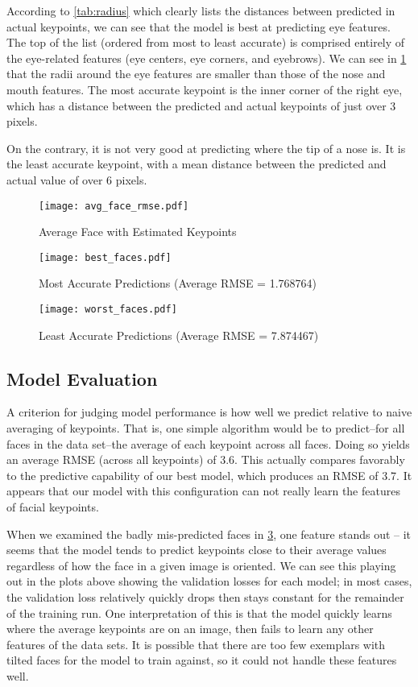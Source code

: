 \documentclass{article}
\begin{document}
According to \ref{tab:radius} which clearly lists the distances between predicted in actual keypoints, we can see that the model is best at predicting eye features. The top of the list (ordered from most to least accurate) is comprised entirely of the eye-related features (eye centers, eye corners, and eyebrows). We can see in \ref{fig:avg_face_rmse} that the radii around the eye features are smaller than those of the nose and mouth features. The most accurate keypoint is the inner corner of the right eye, which has a distance between the predicted and actual keypoints of just over 3 pixels.

On the contrary, it is not very good at predicting where the tip of a nose is. It is the least accurate keypoint, with a mean distance between the predicted and actual value of over 6 pixels.



\begin{figure}[!htb]
  \centering
  \caption{Average Face with Estimated Keypoints}
  \texttt{[image: avg\_face\_rmse.pdf]}
  \label{fig:avg_face_rmse}
\end{figure}
\begin{figure}[!htb]
  \centering
  \caption{Most Accurate Predictions (Average RMSE = 1.768764)}
  \texttt{[image: best\_faces.pdf]}
  \label{fig:best_faces}
\end{figure}
\newpage
\begin{figure}[!htb]
  \centering
  \caption{Least Accurate Predictions (Average RMSE = 7.874467)}
  \texttt{[image: worst\_faces.pdf]}
  \label{fig:worst_faces}
\end{figure}
\subsection{Model Evaluation}

A criterion for judging model performance is how well we predict relative to naive averaging of keypoints. That is, one simple algorithm would be to predict--for all faces in the data set--the average of each keypoint across all faces. Doing so yields an average RMSE (across all keypoints) of 3.6. This actually compares favorably to the predictive capability of our best model, which produces an RMSE of 3.7. It appears that our model with this configuration can not really learn the features of facial keypoints.

When we examined the badly mis-predicted faces in \ref{fig:worst_faces}, one feature stands out -- it seems that the model tends to predict keypoints close to their average values regardless of how the face in a given image is oriented. We can see this playing out in the plots above showing the validation losses for each model; in most cases, the validation loss relatively quickly drops then stays constant for the remainder of the training run. One interpretation of this is that the model quickly learns where the average keypoints are on an image, then fails to learn any other features of the data sets. It is possible that there are too few exemplars with tilted faces for the model to train against, so it could not handle these features well.
\end{document}
